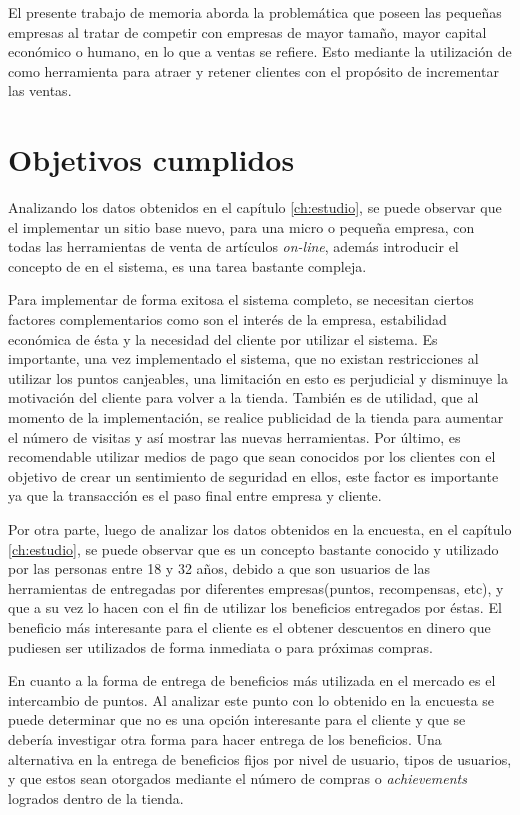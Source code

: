 El presente trabajo de memoria aborda la problemática que poseen las pequeñas
empresas al tratar de competir con empresas de mayor tamaño, mayor capital
económico o humano, en lo que a ventas se refiere. Esto mediante la utilización de {\gam} 
como herramienta para atraer y retener clientes con el propósito de incrementar las ventas.

\section{Objetivos cumplidos}

Analizando los datos obtenidos en el capítulo \ref{ch:estudio}, se puede observar que el
implementar un sitio base nuevo, para una micro o pequeña empresa, con todas las
herramientas de venta de artículos \emph{on-line}, además introducir el concepto de {\gam} en el sistema,
 es una tarea bastante compleja.

Para implementar de forma exitosa el sistema completo, se necesitan ciertos factores
complementarios como son el interés de la empresa, estabilidad económica de ésta y la necesidad del cliente 
por utilizar el sistema. Es importante, una vez implementado el sistema, que no existan restricciones 
al utilizar los puntos canjeables, una limitación en esto es perjudicial y disminuye la motivación del 
cliente para volver a la tienda.
También es de utilidad, que al momento de la implementación, se realice publicidad
de la tienda para aumentar el número de visitas y así mostrar las nuevas herramientas. 
Por último, es recomendable utilizar medios de pago que sean conocidos
por los clientes con el objetivo de crear un sentimiento de seguridad en ellos, este factor es importante
ya que la transacción es el paso final entre empresa y cliente.

Por otra parte, luego de analizar los datos obtenidos en la encuesta, en el capítulo \ref{ch:estudio},
 se puede observar que {\gam} es un concepto bastante conocido y utilizado por las personas
entre 18 y 32 años, debido a que son usuarios de las herramientas de {\gam} entregadas por
diferentes empresas(puntos, recompensas, etc), y que a su vez lo hacen con el fin de utilizar los beneficios entregados
por éstas. El beneficio más interesante para el cliente es el obtener descuentos en dinero
que pudiesen ser utilizados de forma inmediata o para próximas compras.

En cuanto a la forma de entrega de beneficios más utilizada en el mercado es el intercambio de puntos.
Al analizar este punto con lo obtenido en la encuesta se puede determinar que no es
una opción interesante para el cliente y que se debería investigar otra forma para
hacer entrega de los beneficios. Una alternativa en la entrega de beneficios fijos por nivel
de usuario, tipos de usuarios,  y que estos sean otorgados mediante el número de compras o \emph{achievements} logrados
dentro de la tienda.

